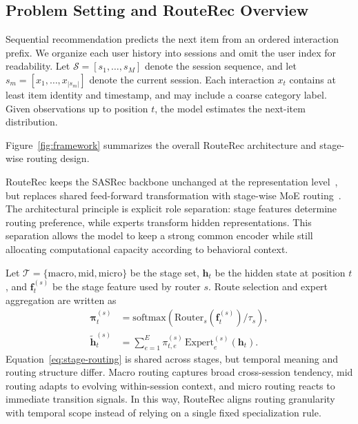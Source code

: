 \documentclass[sigconf,anonymous,review]{acmart-primary/acmart}
\begin{document}
\subsection{Problem Setting and RouteRec Overview}
\label{sec:problem-framework}

Sequential recommendation predicts the next item from an ordered interaction prefix. We organize each user history into sessions and omit the user index for readability. Let $\mathcal{S}=[s_1,\dots,s_M]$ denote the session sequence, and let $s_m=[x_1,\dots,x_{|s_m|}]$ denote the current session. Each interaction $x_t$ contains at least item identity and timestamp, and may include a coarse category label. Given observations up to position $t$, the model estimates the next-item distribution.

Figure~\ref{fig:framework} summarizes the overall RouteRec architecture and stage-wise routing design.

RouteRec keeps the SASRec backbone unchanged at the representation level~\cite{kang2018sasrec}, but replaces shared feed-forward transformation with stage-wise MoE routing~\cite{jordan1994hme,shazeer2017moe,fedus2022switch}. The architectural principle is explicit role separation: stage features determine routing preference, while experts transform hidden representations. This separation allows the model to keep a strong common encoder while still allocating computational capacity according to behavioral context.

Let $\mathcal{T}=\{\mathrm{macro},\mathrm{mid},\mathrm{micro}\}$ be the stage set, $\mathbf{h}_t$ be the hidden state at position $t$, and $\mathbf{f}^{(s)}_t$ be the stage feature used by router $s$. Route selection and expert aggregation are written as
\begin{align}
\boldsymbol{\pi}^{(s)}_t
&=
\mathrm{softmax}\!\left(\mathrm{Router}_s(\mathbf{f}^{(s)}_t)/\tau_s\right), \\
\tilde{\mathbf{h}}^{(s)}_t
&=
\sum_{e=1}^{E}\pi^{(s)}_{t,e}\,\mathrm{Expert}^{(s)}_e(\mathbf{h}_t).
\label{eq:stage-routing}
\end{align}
Equation~\eqref{eq:stage-routing} is shared across stages, but temporal meaning and routing structure differ. Macro routing captures broad cross-session tendency, mid routing adapts to evolving within-session context, and micro routing reacts to immediate transition signals. In this way, RouteRec aligns routing granularity with temporal scope instead of relying on a single fixed specialization rule.
\end{document}
